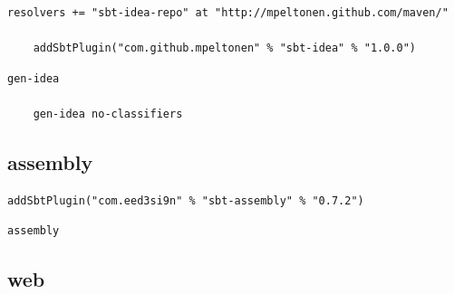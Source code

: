 \documentclass[utf8,utf8x]{beamer}
\begin{document}
\begin{frame}[fragile]

  \begin{lstlisting}[title={plugins.sbt}]
    resolvers += "sbt-idea-repo" at "http://mpeltonen.github.com/maven/"

    addSbtPlugin("com.github.mpeltonen" % "sbt-idea" % "1.0.0")
  \end{lstlisting}

  \begin{lstlisting}[title={usage}]
    gen-idea
    
    gen-idea no-classifiers
  \end{lstlisting}

\end{frame}

\subsection{assembly}

\begin{frame}[fragile]
  \begin{lstlisting}[title={plugins.sbt}]
    addSbtPlugin("com.eed3si9n" % "sbt-assembly" % "0.7.2")
  \end{lstlisting}

  \begin{lstlisting}[title={usage}]
    assembly
  \end{lstlisting}
\end{frame}

\subsection{web}
\end{document}
